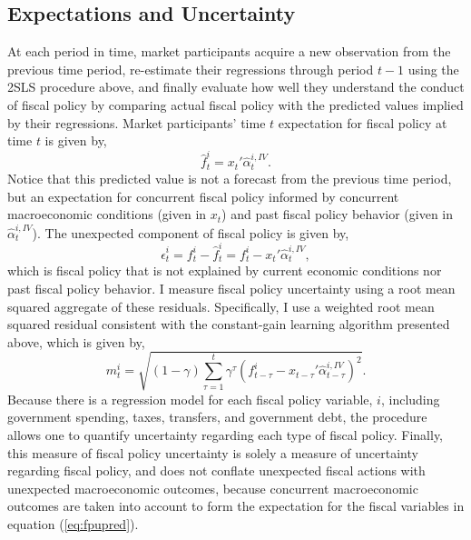 \documentclass[11pt]{article}
\newcommand{\beq}{\begin{equation}}
\newcommand{\eeq}{\end{equation}}
\newcommand{\ds}{\displaystyle}
\begin{document}
\subsection{Expectations and Uncertainty}
At each period in time, market participants acquire a new observation from the previous time period, re-estimate their regressions through period $t-1$ using the 2SLS procedure above, and finally evaluate how well they understand the conduct of fiscal policy by comparing actual fiscal policy with the predicted values implied by their regressions.  Market participants' time $t$ expectation for fiscal policy at time $t$ is given by,
\beq \label{eq:fpupred} \hat{f}^i_t = x_t' \hat{\alpha}_t^{i,IV}. \eeq
Notice that this predicted value is not a forecast from the previous time period, but an expectation for concurrent fiscal policy informed by concurrent macroeconomic conditions (given in $x_t$) and past fiscal policy behavior (given in $\hat{\alpha}_t^{i,IV}$).  The unexpected component of fiscal policy is given by,
\beq \hat{\epsilon}^i_t = f^i_t - \hat{f}^i_t = f^i_t - x_t' \hat{\alpha}_t^{i,IV}, \eeq
which is fiscal policy that is not explained by current economic conditions nor past fiscal policy behavior.  I measure fiscal policy uncertainty using a root mean squared aggregate of these residuals.   Specifically, I use a weighted root mean squared residual consistent with the constant-gain learning algorithm presented above, which is given by,
\beq \label{eq:fpu} m_{t}^i = \sqrt{ (1-\gamma) \ds \sum_{\tau=1}^{t} \gamma^{\tau} (f^i_{t-\tau} - x_{t-\tau}'\hat{\alpha}_{t-\tau}^{i,IV} )^2}. \eeq  
Because there is a regression model for each fiscal policy variable, $i$, including government spending, taxes, transfers, and government debt, the procedure allows one to quantify uncertainty regarding each type of fiscal policy.  Finally, this measure of fiscal policy uncertainty is solely a measure of uncertainty regarding fiscal policy, and does not conflate unexpected fiscal actions with unexpected macroeconomic outcomes, because concurrent macroeconomic outcomes are taken into account to form the expectation for the fiscal variables in equation (\ref{eq:fpupred}).
 
\end{document}
